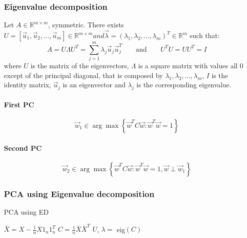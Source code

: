 \documentclass[a4paper,6pt,twocolumn,fleqn]{article}
\begin{document}
\subsubsection{Eigenvalue decomposition} %
Let \(A \in \mathbb{R}^{m \times m}\), symmetric. There exists \(U = \left[ \vec{u}_1, \vec{u}_2, ..., \vec{u}_m \right] \in \mathbb{R}^{m \times m} and \vec{\lambda} = (\lambda_1, \lambda_2, ..., \lambda_m)^T \in \mathbb{R}^{m}\) such that:
\begin{equation}
    A = U \Lambda U^T = \sum_{j=1}^m \lambda_j \vec{u}_j \vec{u}_j^T \qquad \text{and} \qquad U^T U = UU^T = I
\end{equation}
where \(U\) is the matrix of the eigenvectors, \(\Lambda\) is a square matrix with values all 0 except of the principal diagonal, that is composed by \(\lambda_1, \lambda_2, ..., \lambda_m\), \(I\) is the identity matrix, \(\vec{u}_j\) is an eigenvector and \(\lambda_j\) is the corresponding eigenvalue.

\paragraph{First PC}
\begin{equation}
    \vec{w}_1 \in \arg \max \left\{ \vec{w}^T C \vec{w} : \vec{w}^T \vec{w} = 1 \right\}
\end{equation}

\paragraph{Second PC}
\begin{equation}
    \vec{w}_2 \in \arg \max \left\{ \vec{w}^T C \vec{w} : \vec{w}^T \vec{w} = 1, \vec{w} \perp \vec{w}_1 \right\}
\end{equation}

\subsubsection{PCA using Eigenvalue decomposition} %
\begin{algorithm}
    \caption{PCA using ED}
    $\bar X = X - \frac 1 n X 1_n 1_n^T$\;
    $C = \frac 1 n \bar X \bar X^T$\;
    $U$, $\lambda = $ eig$(C)$\;
\end{algorithm}
\end{document}
